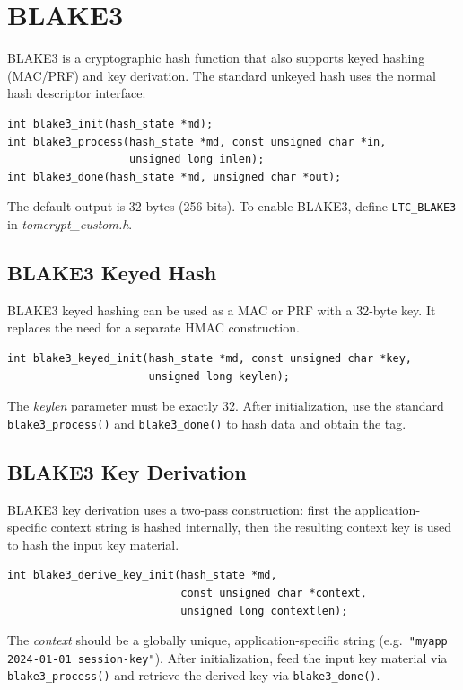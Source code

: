 \documentclass[synpaper]{book}
\newcommand{\mysection}[1]    %
	{                   %
	\section{#1}
   \markboth{\textsf{www.libtom.net}}{\thesection ~ {#1}}
	}
\begin{document}
\mysection{BLAKE3}
BLAKE3 is a cryptographic hash function that also supports keyed hashing (MAC/PRF) and key derivation.
The standard unkeyed hash uses the normal hash descriptor interface:

\begin{verbatim}
int blake3_init(hash_state *md);
int blake3_process(hash_state *md, const unsigned char *in,
                   unsigned long inlen);
int blake3_done(hash_state *md, unsigned char *out);
\end{verbatim}

The default output is 32 bytes (256 bits).
To enable BLAKE3, define \texttt{LTC\_BLAKE3} in \textit{tomcrypt\_custom.h}.

\subsection{BLAKE3 Keyed Hash}
BLAKE3 keyed hashing can be used as a MAC or PRF with a 32-byte key.  It replaces the need for a
separate HMAC construction.

\begin{verbatim}
int blake3_keyed_init(hash_state *md, const unsigned char *key,
                      unsigned long keylen);
\end{verbatim}

The \textit{keylen} parameter must be exactly 32.  After initialization, use the standard
\texttt{blake3\_process()} and \texttt{blake3\_done()} to hash data and obtain the tag.

\subsection{BLAKE3 Key Derivation}
BLAKE3 key derivation uses a two-pass construction: first the application-specific context string is
hashed internally, then the resulting context key is used to hash the input key material.

\begin{verbatim}
int blake3_derive_key_init(hash_state *md,
                           const unsigned char *context,
                           unsigned long contextlen);
\end{verbatim}

The \textit{context} should be a globally unique, application-specific string (e.g.\
\texttt{"myapp 2024-01-01 session-key"}).  After initialization, feed the input key material via
\texttt{blake3\_process()} and retrieve the derived key via \texttt{blake3\_done()}.
\end{document}
